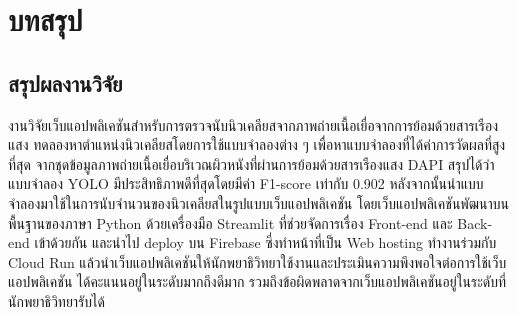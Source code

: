 \documentclass[12pt,oneside,openright,a4paper]{cpe-thai-project}
\begin{document}
\chapter{บทสรุป}
\section{สรุปผลงานวิจัย}
งานวิจัยเว็บแอปพลิเคชันสำหรับการตรวจนับนิวเคลียสจากภาพถ่ายเนื้อเยื่อจากการย้อมด้วยสารเรืองแสง ทดลองหาตำแหน่งนิวเคลียสโดยการใช้แบบจำลองต่าง ๆ เพื่อหาแบบจำลองที่ได้ค่าการวัดผลที่สูงที่สุด จากชุดข้อมูลภาพถ่ายเนื้อเยื่อบริเวณผิวหนังที่ผ่านการย้อมด้วยสารเรืองแสง DAPI สรุปได้ว่าแบบจำลอง YOLO มีประสิทธิภาพดีที่สุดโดยมีค่า F1-score เท่ากับ 0.902 หลังจากนั้นนำแบบจำลองมาใช้ในการนับจำนวนของนิวเคลียสในรูปแบบเว็บแอปพลิเคชัน โดยเว็บแอปพลิเคชันพัฒนาบนพื้นฐานของภาษา Python ด้วยเครื่องมือ Streamlit ที่ช่วยจัดการเรื่อง Front-end และ Back-end เข้าด้วยกัน และนำไป deploy บน Firebase ซี่งทําหน้าที่เป็น Web hosting ทํางานร่วมกับ Cloud Run แล้วนำเว็บแอปพลิเคชันให้นักพยาธิวิทยาใช้งานและประเมินความพึงพอใจต่อการใช้เว็บแอปพลิเคชัน ได้คะแนนอยู่ในระดับมากถึงดีมาก รวมถึงข้อผิดพลาดจากเว็บแอปพลิเคชันอยู่ในระดับที่นักพยาธิวิทยารับได้

\end{document}

